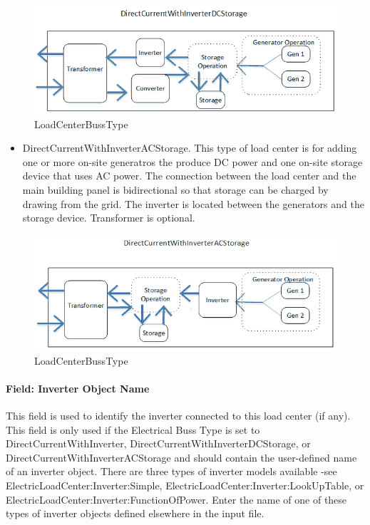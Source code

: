 \begin{figure}[htbp]
\centering
\includegraphics{media/DCInverterWithDCStorageBussDiagram.png}
\caption{LoadCenterBussType}
\end{figure}

\begin{itemize}
\tightlist
\item
  DirectCurrentWithInverterACStorage. This type of load center is for adding one or more on-site generatros the produce DC power and one on-site storage device that uses AC power. The connection between the load center and the main building panel is bidirectional so that storage can be charged by drawing from the grid. The inverter is located between the generators and the storage device. Transformer is optional.
\end{itemize}

\begin{figure}[htbp]
\centering
\includegraphics{media/DCInverterWithACStorageBussDiagram.png}
\caption{LoadCenterBussType}
\end{figure}

\paragraph{Field: Inverter Object Name}\label{field-inverter-object-name}

This field is used to identify the inverter connected to this load center (if any). This field is only used if the Electrical Buss Type is set to DirectCurrentWithInverter, DirectCurrentWithInverterDCStorage, or DirectCurrentWithInverterACStorage and should contain the user-defined name of an inverter object. There are three types of inverter models available -see ElectricLoadCenter:Inverter:Simple, ElectricLoadCenter:Inverter:LookUpTable, or ElectricLoadCenter:Inverter:FunctionOfPower. Enter the name of one of these types of inverter objects defined elsewhere in the input file.

